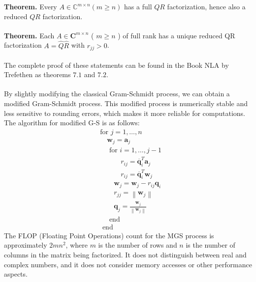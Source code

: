 \documentclass[11pt]{book}
\begin{document}
\textbf{Theorem.} Every $A \in \mathbb{C}^{m \times n}(m \geq n)$ has a full $Q R$ factorization, hence also a reduced $Q R$ factorization.\\ \\
\textbf{Theorem.} Each $A \in \mathbf{C}^{m \times n}$ ( $m \geq n$ ) of full rank has a unique reduced QR factorization $A=\hat{Q} \hat{R}$ with $r_{j j}>0$.\\ \\
The complete proof of these statements can be found in the Book NLA by Trefethen as theorems $7.1$ and $7.2$.\\ \\
By slightly modifying the classical Gram-Schmidt process, we can obtain a modified Gram-Schmidt process. This modified process is numerically stable and less sensitive to rounding errors, which makes it more reliable for computations.
The algorithm for modified G-S is as follows:\\
$$
\begin{aligned}
& \text {for } j=1, \ldots, n \\
& \hspace{1em} \mathbf{w}_{j}=\mathbf{a}_{j} \\
& \hspace{1em} \text { for } i=1, \ldots, j-1 \\
& \hspace{3em} r_{i j}=\overline{\mathbf{q}}_i^T \mathbf{a}_j \\
&  \hspace{3em} r_{i j}=\overline{\mathbf{q}}_{i}^{T} \mathbf{w}_{j} \\
& \hspace{2em} \mathbf{w}_{j}=\mathbf{w}_{j}-r_{i j} \mathbf{q}_{i} \\
& \hspace{2em} r_{j j}=\left\|\mathbf{w}_{j}\right\| \\
& \hspace{2em} \mathbf{q}_{j}=\frac{\mathbf{w}_{j}}{\left\|\mathbf{w}_{j}\right\|} \\
& \hspace{1em} \text { end } \\
& \text { end }
\end{aligned}
$$
The FLOP (Floating Point Operations) count for the MGS process is approximately $2mn^2$, where $m$ is the number of rows and $n$ is the number of columns in the matrix being factorized. It does not distinguish between real and complex numbers, and it does not consider memory accesses or other performance aspects. 
\end{document}
